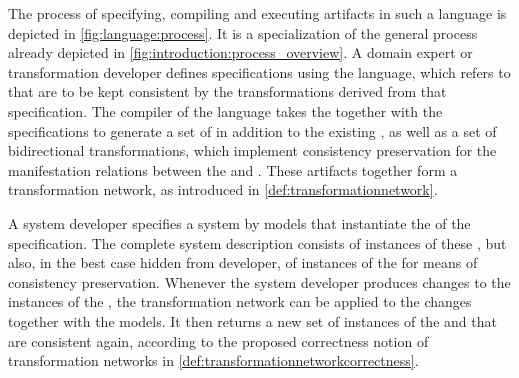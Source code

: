 The process of specifying, compiling and executing artifacts in such a language is depicted in \autoref{fig:language:process}.
It is a specialization of the general process already depicted in \autoref{fig:introduction:process_overview}.
A domain expert or transformation developer defines \commonalities specifications using the language, which refers to \concretemetamodels that are to be kept consistent by the transformations derived from that specification.
The compiler of the language takes the \concretemetamodels together with the specifications to generate a set of \conceptmetamodels in addition to the existing \concretemetamodels, as well as a set of bidirectional transformations, which implement consistency preservation for the manifestation relations between the \conceptmetamodels and \concretemetamodels.
These artifacts together form a transformation network, as introduced in \autoref{def:transformationnetwork}.

A system developer specifies a system by models that instantiate the \concretemetamodels of the \commonalities specification.
The complete system description consists of instances of these \concretemetamodels, but also, in the best case hidden from developer, of instances of the \conceptmetamodels for means of consistency preservation.
Whenever the system developer produces changes to the instances of the \concretemetamodels, the transformation network can be applied to the changes together with the models.
It then returns a new set of instances of the \concretemetamodel and \conceptmetamodels that are consistent again, according to the proposed correctness notion of transformation networks in \autoref{def:transformationnetworkcorrectness}.




